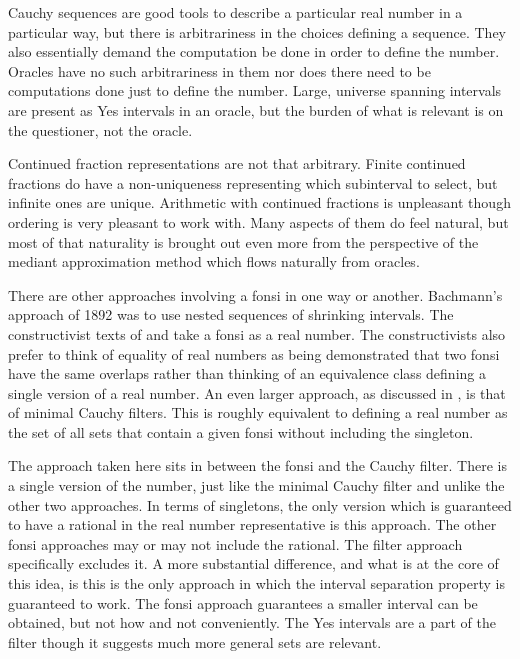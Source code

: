 \documentclass[12pt]{article}
\theoremstyle{remark}
\begin{document}
Cauchy sequences are good tools to describe a particular real number in a particular way, but there is arbitrariness in the choices defining a sequence. They also essentially demand the computation be done in order to define the number. Oracles have no such arbitrariness in them nor does there need to be computations done just to define the number. Large, universe spanning intervals are present as Yes intervals in an oracle, but the burden of what is relevant is on the questioner, not the oracle. 

Continued fraction representations are not that arbitrary. Finite continued fractions do have a non-uniqueness representing which subinterval to select, but infinite ones are unique. Arithmetic with continued fractions is unpleasant though ordering is very pleasant to work with. Many aspects of them do feel natural, but most of that naturality is brought out even more from the perspective of the mediant approximation method which flows naturally from oracles. 

There are other approaches involving a fonsi in one way or another. Bachmann's approach of 1892 was to use nested sequences of shrinking intervals. The constructivist texts of \cite{bridger} and \cite{bridges} take a fonsi as a real number. The constructivists also prefer to think of equality of real numbers as being demonstrated that two fonsi have the same overlaps rather than thinking of an equivalence class defining a single version of a real number. An even larger approach, as discussed in \cite{ittay-2015}, is that of minimal Cauchy filters. This is roughly equivalent to defining a real number as the set of all sets that contain a given fonsi without including the singleton. 

The approach taken here sits in between the fonsi and the Cauchy filter. There is a single version of the number, just like the minimal Cauchy filter and unlike the other two approaches. In terms of singletons, the only version which is guaranteed to have a rational in the real number representative is this approach. The other fonsi approaches may or may not include the rational. The filter approach specifically excludes it. A more substantial difference, and what is at the core of this idea, is this is the only approach in which the interval separation property is guaranteed to work. The fonsi approach guarantees a smaller interval can be obtained, but not how and not conveniently. The Yes intervals are a part of the filter though it suggests much more general sets are relevant. 
\end{document}

